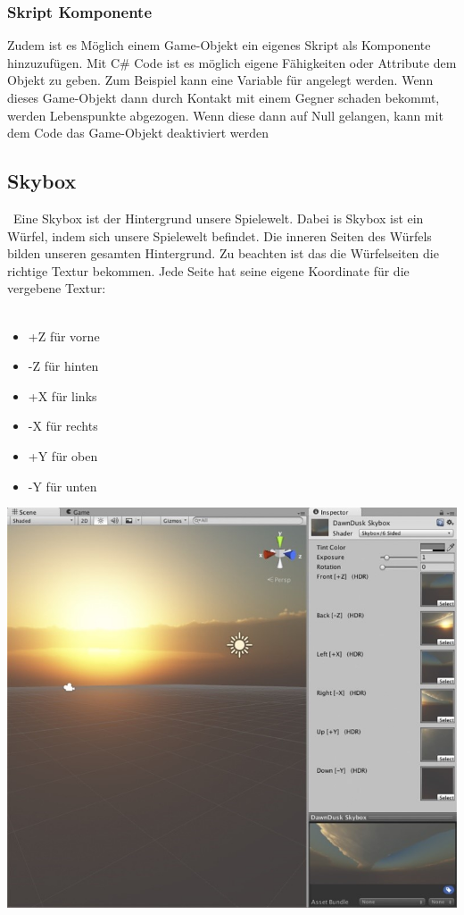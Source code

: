 \pagebreak
{}

\subsubsection{Skript Komponente}
Zudem ist es Möglich einem Game-Objekt ein eigenes Skript als Komponente hinzuzufügen. Mit C\# Code ist es möglich eigene Fähigkeiten oder Attribute dem Objekt zu geben. Zum Beispiel kann eine Variable für  angelegt werden. Wenn dieses Game-Objekt dann durch Kontakt mit einem Gegner schaden bekommt, werden Lebenspunkte abgezogen. Wenn diese dann auf Null gelangen, kann mit dem Code das Game-Objekt deaktiviert werden


\subsection{Skybox}\
Eine Skybox ist der Hintergrund unsere Spielewelt. Dabei is Skybox ist ein Würfel, indem sich unsere Spielewelt befindet. Die inneren Seiten des Würfels bilden unseren gesamten Hintergrund.
Zu beachten ist das die Würfelseiten die richtige Textur bekommen. Jede Seite hat seine eigene Koordinate für die vergebene Textur:\\\\

\begin{minipage}{0.4\textwidth}
    \begin{itemize}
        \item +Z für vorne 
        \item -Z für hinten 
        \item +X für links 
        \item -X für rechts
        \item +Y für oben
        \item -Y für unten
    \end{itemize}
  \end{minipage}
  \hfill
  \begin{minipage}{0.6\textwidth}
    \includegraphics[width=\linewidth]{chapters/14/Images/Skybox.png}
  \end{minipage}

